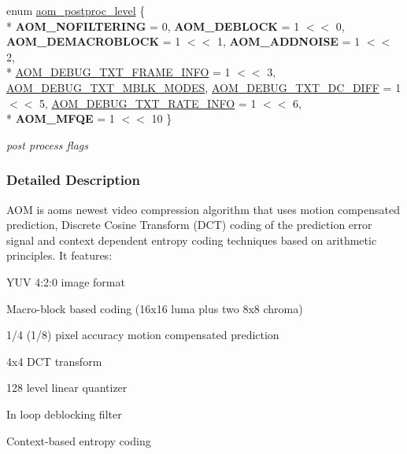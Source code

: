 \begin{DoxyCompactItemize}
\item 
enum \hyperlink{group__aom_gac6080eabf4ec17e97196664eb989cc82}{aom\+\_\+postproc\+\_\+level} \{ \\*
{\bfseries A\+O\+M\+\_\+\+N\+O\+F\+I\+L\+T\+E\+R\+I\+NG} = 0, 
{\bfseries A\+O\+M\+\_\+\+D\+E\+B\+L\+O\+CK} = 1 $<$$<$ 0, 
{\bfseries A\+O\+M\+\_\+\+D\+E\+M\+A\+C\+R\+O\+B\+L\+O\+CK} = 1 $<$$<$ 1, 
{\bfseries A\+O\+M\+\_\+\+A\+D\+D\+N\+O\+I\+SE} = 1 $<$$<$ 2, 
\\*
\hyperlink{group__aom_ggac6080eabf4ec17e97196664eb989cc82a954d7e31134442c20e9d27f0ac9113b8}{A\+O\+M\+\_\+\+D\+E\+B\+U\+G\+\_\+\+T\+X\+T\+\_\+\+F\+R\+A\+M\+E\+\_\+\+I\+N\+FO} = 1 $<$$<$ 3, 
\hyperlink{group__aom_ggac6080eabf4ec17e97196664eb989cc82a7f9333b6fa79f7231ae73e1effafb25b}{A\+O\+M\+\_\+\+D\+E\+B\+U\+G\+\_\+\+T\+X\+T\+\_\+\+M\+B\+L\+K\+\_\+\+M\+O\+D\+ES}, 
\hyperlink{group__aom_ggac6080eabf4ec17e97196664eb989cc82a67340f012436cb0039d3cdc62244ca50}{A\+O\+M\+\_\+\+D\+E\+B\+U\+G\+\_\+\+T\+X\+T\+\_\+\+D\+C\+\_\+\+D\+I\+FF} = 1 $<$$<$ 5, 
\hyperlink{group__aom_ggac6080eabf4ec17e97196664eb989cc82a2ed5c856f44d6de7d5e72aa7f826df56}{A\+O\+M\+\_\+\+D\+E\+B\+U\+G\+\_\+\+T\+X\+T\+\_\+\+R\+A\+T\+E\+\_\+\+I\+N\+FO} = 1 $<$$<$ 6, 
\\*
{\bfseries A\+O\+M\+\_\+\+M\+F\+QE} = 1 $<$$<$ 10
 \}\begin{DoxyCompactList}\small\item\em post process flags \end{DoxyCompactList}
\end{DoxyCompactItemize}


\subsubsection{Detailed Description}
A\+OM is aom\textquotesingle{}s newest video compression algorithm that uses motion compensated prediction, Discrete Cosine Transform (D\+CT) coding of the prediction error signal and context dependent entropy coding techniques based on arithmetic principles. It features\+:
\begin{DoxyItemize}
\item Y\+UV 4\+:2\+:0 image format
\item Macro-\/block based coding (16x16 luma plus two 8x8 chroma)
\item 1/4 (1/8) pixel accuracy motion compensated prediction
\item 4x4 D\+CT transform
\item 128 level linear quantizer
\item In loop deblocking filter
\item Context-\/based entropy coding 
\end{DoxyItemize}

